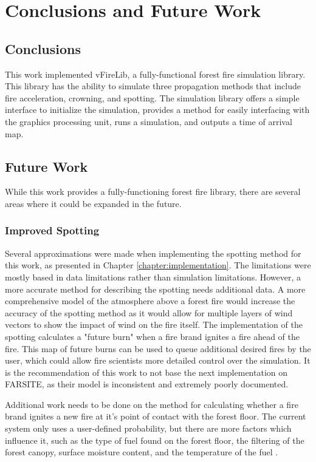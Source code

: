 \chapter{Conclusions and Future Work}
\label{chapter:conclusions}

\section{Conclusions}
This work implemented vFireLib, a fully-functional forest fire simulation library. This library has the ability to simulate three propagation methods that include fire acceleration, crowning, and spotting. The simulation library offers a simple interface to initialize the simulation, provides a method for easily interfacing with the graphics processing unit, runs a simulation, and outputs a time of arrival map. 

\section{Future Work}
While this work provides a fully-functioning forest fire library, there are several areas where it could be expanded in the future. 

\subsection{Improved Spotting} 
Several approximations were made when implementing the spotting method for this work, as presented in Chapter \ref{chapter:implementation}. The limitations were mostly based in data limitations rather than simulation limitations. However, a more accurate method for describing the spotting needs additional data. A more comprehensive model of the atmosphere above a forest fire would increase the accuracy of the spotting method as it would allow for multiple layers of wind vectors to show the impact of wind on the fire itself. The implementation of the spotting calculates a "future burn" when a fire brand ignites a fire ahead of the fire. This map of future burns can be used to queue additional desired fires by the user, which could allow fire scientists more detailed control over the simulation. It is the recommendation of this work to not base the next implementation on FARSITE, as their model is inconsistent and extremely poorly documented. 

Additional work needs to be done on the method for calculating whether a fire brand ignites a new fire at it's point of contact with the forest floor. The current system only uses a user-defined probability, but there are more factors which influence it, such as the type of fuel found on the forest floor, the filtering of the forest canopy, surface moisture content, and the temperature of the fuel \cite{bradshaw1984,blackmarr1972,bunting1974}.

